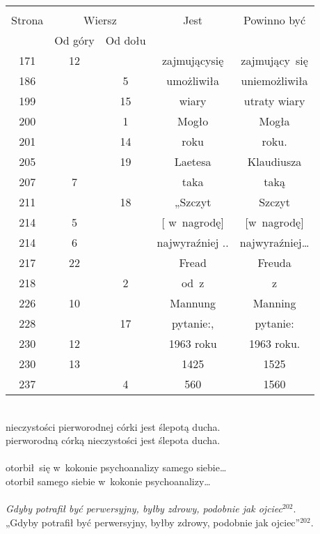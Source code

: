 \documentclass[a4paper,11pt]{article}
\begin{document}
\begin{center}
  \begin{tabular}{|c|c|c|c|c|}
    \hline
    & \multicolumn{2}{c|}{} & & \\
    Strona & \multicolumn{2}{c|}{Wiersz} & Jest
                              & Powinno być \\ \cline{2-3}
    & Od góry & Od dołu & & \\
    \hline
    171 & 12 & & zajmującysię & zajmujący~się \\
    186 & &  5 & umożliwiła & uniemożliwiła \\
    199 & & 15 & wiary & utraty wiary \\
    200 & &  1 & Mogło & Mogła \\
    201 & & 14 & roku & roku. \\
    205 & & 19 & Laetesa & Klaudiusza \\
    207 &  7 & & taka & taką \\
    211 & & 18 & „Szczyt & Szczyt \\
    214 &  5 & & [ w~nagrodę] & [w~nagrodę] \\
    214 &  6 & & najwyraźniej .. & najwyraźniej\ldots \\
    217 & 22 & & Fread & Freuda \\
    218 & &  2 & od~z & z \\
    226 & 10 & & Mannung & Manning \\
    228 & & 17 & pytanie:, & pytanie: \\
    230 & 12 & & 1963 roku & 1963 roku. \\
    230 & 13 & & 1425 & 1525 \\
    237 & &  4 & 560 & 1560 \\
    \hline
  \end{tabular}

\end{center}


\noindent
{} \\
\Jest  nieczystości pierworodnej córki jest ślepotą ducha. \\
\Powin pierworodną córką nieczystości jest ślepota ducha. \\
 \\
\Jest  otorbił~się w~kokonie psychoanalizy samego siebie\ldots \\
\Powin otorbił samego siebie w~kokonie psychoanalizy\ldots \\
 \\
\Jest  \textit{Gdyby potrafił być perwersyjny, byłby zdrowy, podobnie jak
  ojciec$^{ 202 }$}. \\
\Powin „Gdyby potrafił być perwersyjny, byłby zdrowy,
podobnie jak ojciec”$^{ 202 }$. \\
\end{document}
